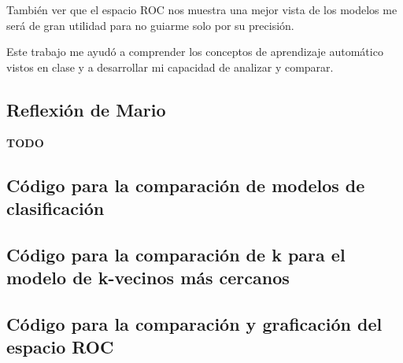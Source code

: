 \documentclass[sigconf,authorversion,nonacm]{acmart}
\begin{document}
También ver que el espacio ROC nos muestra una mejor vista de los modelos me será de gran utilidad para no guiarme solo por su precisión.

Este trabajo me ayudó a comprender los conceptos de aprendizaje automático vistos en clase y a desarrollar mi capacidad de analizar y comparar.


\subsection{Reflexión de Mario}
\textbf{TODO}





\clearpage

\appendix

\lstset{style=customstyle}

\begin{figure*}
  \section{Código para la comparación de modelos de clasificación}
  \label{appendix:py}
  
\end{figure*}

\begin{figure*}
  
\end{figure*}

\begin{figure*}
  \section{Código para la comparación de k para el modelo de k-vecinos más cercanos}
  \label{appendix:knnpy}
  
\end{figure*}

\begin{figure*}
  \section{Código para la comparación y graficación del espacio ROC}
  \label{appendix:knnpy}
  
\end{figure*}
\end{document}
